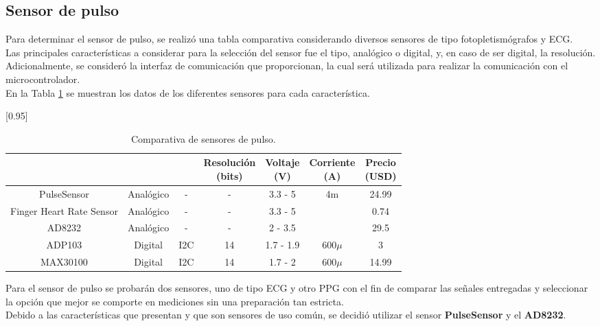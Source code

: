
\subsection{Sensor de pulso}
Para determinar el sensor de pulso, se realizó una tabla comparativa considerando diversos sensores de tipo fotopletismógrafos y ECG. \\

Las principales características a considerar para la selección del sensor fue el tipo, analógico o digital, y, en caso de ser digital, la resolución. Adicionalmente, se consideró la interfaz de comunicación que proporcionan, la cual será utilizada para realizar la comunicación con el microcontrolador.\\

En la Tabla \ref{analisis:sensorPulso} se muestran los datos de los diferentes sensores para cada característica.

\begin{table}[htbp]
	\begin{center}
		\scalebox{0.95}[0.95]{
		\begin{tabular}{|c|c|c|c|c|c|c|}
			\hline
			\thead{Modelo}&\thead{Tipo}&\thead{Interfaz}&\thead{Resolución \\ (bits)}&\thead{Voltaje \\ (V)}& \thead{Corriente \\ (A)}&\thead{Precio\\ (USD)}\\
			\hline
			\hline
			PulseSensor & Analógico&-&-& 3.3 - 5&4m&24.99 \\
			\hline
			Finger Heart Rate Sensor & Analógico& -&- & 3.3 - 5&&0.74 \\
			\hline
			AD8232 & Analógico& -& - & 2 - 3.5&&29.5 \\
			\hline
			ADP103 & Digital& I2C& 14 & 1.7 - 1.9&$600\mu$&3 \\
			\hline
			MAX30100 & Digital& I2C &14 & 1.7 - 2&$600\mu$&14.99 \\
			\hline
		\end{tabular}}
		\caption{Comparativa de sensores de pulso.}
		\label{analisis:sensorPulso}
	\end{center}
\end{table}
	
Para el sensor de pulso se probarán dos sensores, uno de tipo ECG y otro PPG con el fin de comparar las señales entregadas y seleccionar la opción que mejor se comporte en mediciones sin una preparación tan estricta. \\

Debido a las características que presentan y que son sensores de uso común, se decidió utilizar el sensor \textbf{PulseSensor} y el \textbf{AD8232}. \\

\pagebreak